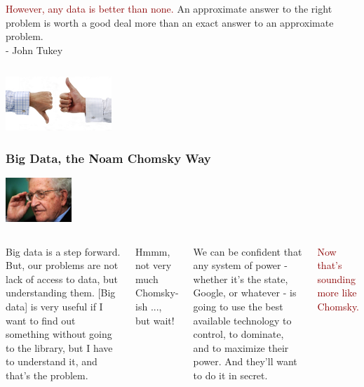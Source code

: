 \documentclass{beamer}
\begin{document}
\begin{frame}
\begin{columns}
\column{28em}
\vspace{2cm}
\begin{block}{\centering\textcolor{darkred}{However, any data is better than none.}}
\justifying
An approximate answer to the right problem is worth a good deal more than an exact answer to an approximate problem.\\
\vspace{.2cm}
\hspace*{8.7cm}\footnotesize{- John Tukey}
\end{block}
\end{columns}
\vspace{.75cm}
\hspace*{8cm}\includegraphics[width=4cm]{figs/deal.pdf}
\end{frame}

\begin{frame}
\frametitle{Big Data, the Noam Chomsky Way}
\hspace*{9cm}\includegraphics[width=2.5cm]{figs/chamsky.pdf}
\begin{columns}[c] 
\column{26em}
\begin{block}{}
\justifying
{\scriptsize Big data is a step forward. But, our problems are not lack of access to data, but understanding them. [Big data] is very useful if I want to find out something without going to the library, but I have to understand it, and that's the problem.}
\end{block}
\pause
\centering
\textcolor{Ocean}{Hmmm, not very much Chomsky-ish ..., but wait!}
\pause
\begin{block}{}
\centering
\justifying
{\scriptsize We can be confident that any system of power - whether it's the state, Google, or whatever - is going to use the best available technology to control, to dominate, and to maximize their power. And they'll want to do it in secret.}
\end{block}
\centering
\textcolor{darkred}{Now that's sounding more like Chomsky.}
\end{columns}
\end{frame}
\end{document}
